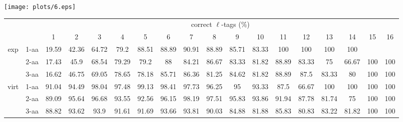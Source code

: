 \documentclass{article}
\begin{document}
\texttt{[image: plots/6.eps]}\begin{table}[h]\tiny
\vspace{3mm}
{\centering
\begin{center}
\begin{tabular}{|c|l|c|c|c|c|c|c|c|c|c|c|c|c|c|c|c|c|}
  \hline
  \multicolumn{2}{|c|}{ } & \multicolumn{ 16 }{|c|}{ correct $\ell$-tags (\%)} \\
  \cline{3- 18}
  \multicolumn{2}{|c|}{ }  & 1 & 2 & 3 & 4 & 5 & 6 & 7 & 8 & 9 & 10 & 11 & 12 & 13 & 14 & 15 & 16\\
  \hline
  \multirow{3}{*}{exp}
&  1-aa  & 19.59 & 42.36 & 64.72 & 79.2 & 88.51 & 88.89 & 90.91 & 88.89 & 85.71 & 83.33 & 100 & 100 & 100 & 100 &  & \\&  2-aa  & 17.43 & 45.9 & 68.54 & 79.29 & 79.2 & 88 & 84.21 & 86.67 & 83.33 & 81.82 & 88.89 & 83.33 & 75 & 66.67 & 100 & 100\\&  3-aa  & 16.62 & 46.75 & 69.05 & 78.65 & 78.18 & 85.71 & 86.36 & 81.25 & 84.62 & 81.82 & 88.89 & 87.5 & 83.33 & 80 & 100 & 100\\ \hline
  \multirow{3}{*}{virt} 
&  1-aa  & 91.04 & 94.49 & 98.04 & 97.48 & 99.13 & 98.41 & 97.73 & 96.25 & 95 & 93.33 & 87.5 & 66.67 & 100 & 100 & 100 & 100\\&  2-aa  & 89.09 & 95.64 & 96.68 & 93.55 & 92.56 & 96.15 & 98.19 & 97.51 & 95.83 & 93.86 & 91.94 & 87.78 & 81.74 & 75 & 100 & 100\\&  3-aa  & 88.82 & 93.62 & 93.9 & 91.61 & 91.69 & 93.66 & 93.81 & 90.03 & 84.88 & 81.88 & 85.83 & 80.83 & 83.22 & 81.82 & 100 & 100\\ \hline
\end{tabular}
\end{center}
\par}
\centering
\vspace{3mm}
\label{table:table6}
\end{table}
\end{document}
